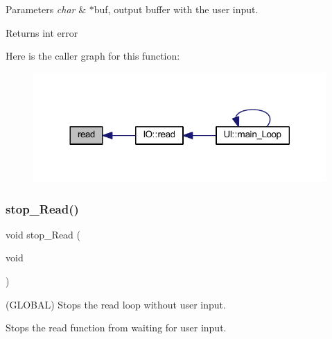 \begin{DoxyParams}{Parameters}
{\em char} & $\ast$buf, output buffer with the user input. \\
\hline
\end{DoxyParams}
\begin{DoxyReturn}{Returns}
int error 
\end{DoxyReturn}
Here is the caller graph for this function\+:\nopagebreak
\begin{figure}[H]
\begin{center}
\leavevmode
\includegraphics[width=317pt]{namespace_u_a_r_t_a1087fba97ca797e5ca155228ff9eec55_icgraph}
\end{center}
\end{figure}
\mbox{\label{namespace_u_a_r_t_a996ffefd3d2ce666720596342364db03}} 
\subsubsection{\texorpdfstring{stop\+\_\+\+Read()}{stop\_Read()}}
{\footnotesize\ttfamily void stop\+\_\+\+Read (\begin{DoxyParamCaption}\item[{void}]{ }\end{DoxyParamCaption})}



(G\+L\+O\+B\+AL) Stops the read loop without user input. 

Stops the read function from waiting for user input.


